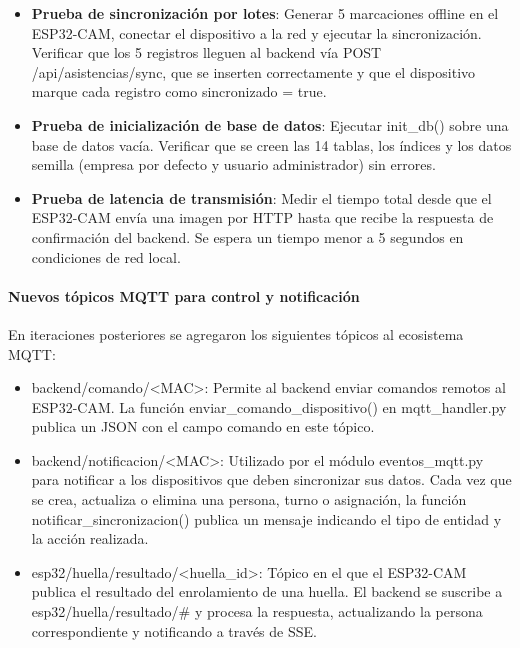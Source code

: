 \begin{itemize}
    \item \textbf{Prueba de sincronización por lotes}: Generar 5 marcaciones offline en el ESP32-CAM, conectar el dispositivo a la red y ejecutar la sincronización. Verificar que los 5 registros lleguen al backend vía POST /api/asistencias/sync, que se inserten correctamente y que el dispositivo marque cada registro como sincronizado = true.

    \item \textbf{Prueba de inicialización de base de datos}: Ejecutar init\_db() sobre una base de datos vacía. Verificar que se creen las 14 tablas, los índices y los datos semilla (empresa por defecto y usuario administrador) sin errores.

    \item \textbf{Prueba de latencia de transmisión}: Medir el tiempo total desde que el ESP32-CAM envía una imagen por HTTP hasta que recibe la respuesta de confirmación del backend. Se espera un tiempo menor a 5 segundos en condiciones de red local.
\end{itemize}

\paragraph{Nuevos tópicos MQTT para control y notificación}

En iteraciones posteriores se agregaron los siguientes tópicos al ecosistema MQTT:

\begin{itemize}
    \item backend/comando/<MAC>: Permite al backend enviar comandos remotos al ESP32-CAM. La función enviar\_comando\_dispositivo() en mqtt\_handler.py publica un JSON con el campo comando en este tópico.

    \item backend/notificacion/<MAC>: Utilizado por el módulo eventos\_mqtt.py para notificar a los dispositivos que deben sincronizar sus datos. Cada vez que se crea, actualiza o elimina una persona, turno o asignación, la función notificar\_sincronizacion() publica un mensaje indicando el tipo de entidad y la acción realizada.

    \item esp32/huella/resultado/<huella\_id>: Tópico en el que el ESP32-CAM publica el resultado del enrolamiento de una huella. El backend se suscribe a esp32/huella/resultado/\# y procesa la respuesta, actualizando la persona correspondiente y notificando a través de SSE.
\end{itemize}

